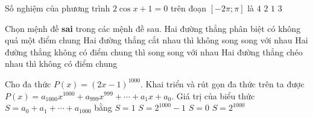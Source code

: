 \begin{ex}%
Số nghiệm của phương trình $2\cos x+1=0$ trên đoạn $\left[-2\pi; \pi \right]$ là
\choice
	{$4$}
	{$2$}
	{$1$}
	{\True $3$}
\loigiai{
Ta có: $2\cos x+1=0$ \\
$ \Leftrightarrow \cos x=-\dfrac{1}{2} \Leftrightarrow \left[\begin{aligned}& x=\dfrac{2\pi}{3}+k2\pi \\ & x=-\dfrac{2\pi}{3}+k2\pi \end{aligned}\right., k\in \mathbb{Z}$ \\
$x\in \left[-2\pi; \pi \right] \Leftrightarrow \left[\begin{aligned}& -2\pi \leqslant \dfrac{2\pi}{3}+k2\pi \leqslant \pi \\ & -2\pi \leqslant -\dfrac{2\pi}{3}+k2\pi \leqslant \pi \end{aligned}\right., k\in \mathbb{Z}$ \\
$ \Leftrightarrow \left[\begin{aligned}& \dfrac{-8\pi}{3}\leqslant k2\pi \leqslant \dfrac{1}{3}\pi \\ & \dfrac{-4\pi}{3}\leqslant k2\pi \leqslant \dfrac{5}{3}\pi \end{aligned}\right., k\in \mathbb{Z}$ \\
$ \Leftrightarrow \left[\begin{aligned}& \dfrac{-4}{3}\leqslant k\leqslant \dfrac{1}{6} \\ & \dfrac{-2}{3}\leqslant k\leqslant \dfrac{5}{6} \end{aligned}\right., k\in \mathbb{Z} \Leftrightarrow \left[\begin{aligned}& k=-1;k=0 \Rightarrow x=\dfrac{-4\pi}{3};x=\dfrac{2\pi}{3} \\ & k=0 \Rightarrow x=\dfrac{-2\pi}{3} \end{aligned}\right. $}
\end{ex}
\begin{ex}%
Chọn mệnh đề \textbf{sai} trong các mệnh đề sau.
\choice
	{Hai đường thẳng phân biệt có không quá một điểm chung}
	{Hai đường thẳng cắt nhau thì không song song với nhau}
	{\True Hai đường thẳng không có điểm chung thì song song với nhau}
	{Hai đường thẳng chéo nhau thì không có điểm chung}
\end{ex}
\begin{ex}%
Cho đa thức $P(x)=(2x-1)^{1000}$. Khai triển và rút gọn đa thức trên ta được $P(x)=a_{1000}x^{1000}+a_{999}x^{999}+\cdots+a_1x+a_0$. Giá trị của biểu thức $S=a_0 + a_1 + \cdots +a_{1000}$ bằng
\choice
	{\True $S=1$}
	{$S=2^{1000}-1$}
	{$S=0$}
	{$S=2^{1000}$}
\end{ex}
